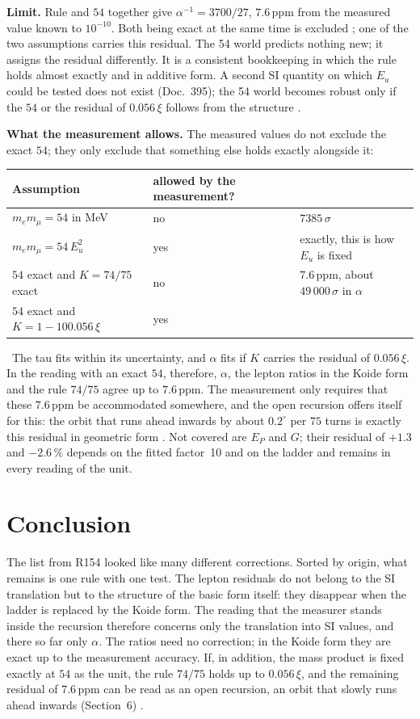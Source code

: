 \textbf{Limit.} Rule and $54$ together give $\alpha^{-1}=3700/27$, $7.6$\,ppm from the measured
value known to $10^{-10}$. Both being exact at the same time is excluded \XM; one of the two
assumptions carries this residual. The 54 world predicts nothing new; it assigns the residual
differently. It is a consistent bookkeeping in which the rule holds almost exactly and in additive
form. A second SI quantity on which $E_u$ could be tested does not exist (Doc.~395); the 54 world becomes
robust only if the $54$ or the residual of $0.056\,\xi$ follows from the structure \SM.

\textbf{What the measurement allows.} The measured values do not exclude the exact $54$; they only
exclude that something else holds exactly alongside it:
\begin{center}
\begin{tabular}{@{}lll@{}}
\toprule
\textbf{Assumption} & \textbf{allowed by the measurement?} & \\
\midrule
$m_em_\mu=54$ in MeV & no & $7385\,\sigma$ \\
$m_em_\mu=54\,E_u^2$ & yes & exactly, this is how $E_u$ is fixed \\
$54$ exact and $K=74/75$ exact & no & $7.6$\,ppm, about $49\,000\,\sigma$ in $\alpha$ \\
$54$ exact and $K=1-100.056\,\xi$ & yes & \\
\bottomrule
\end{tabular}
\end{center}
\KM\ The tau fits within its uncertainty, and $\alpha$ fits if $K$ carries the residual of
$0.056\,\xi$. In the reading with an exact $54$, therefore, $\alpha$, the lepton ratios in the Koide
form and the rule $74/75$ agree up to $7.6$\,ppm. The measurement only requires that these
$7.6$\,ppm be accommodated somewhere, and the open recursion offers itself for this: the orbit that
runs ahead inwards by about $0.2^\circ$ per $75$ turns is exactly this residual in geometric form
\SM. Not covered are $E_P$ and $G$; their residual of $+1.3$ and $-2.6\,\%$ depends on the fitted
factor~10 and on the ladder and remains in every reading of the unit.

\section{Conclusion}

The list from R154 looked like many different corrections. Sorted by origin, what remains is one
rule with one test. The lepton residuals do not belong to the SI translation but to the structure of
the basic form itself: they disappear when the ladder is replaced by the Koide form. The reading
that the measurer stands inside the recursion therefore concerns only the translation into SI values,
and there so far only $\alpha$. The ratios need no correction; in the Koide form they are exact up to
the measurement accuracy. If, in addition, the mass product is fixed exactly at $54$ as the unit,
the rule $74/75$ holds up to $0.056\,\xi$, and the remaining residual of $7.6$\,ppm can be read as
an open recursion, an orbit that slowly runs ahead inwards (Section~6) \SM.

